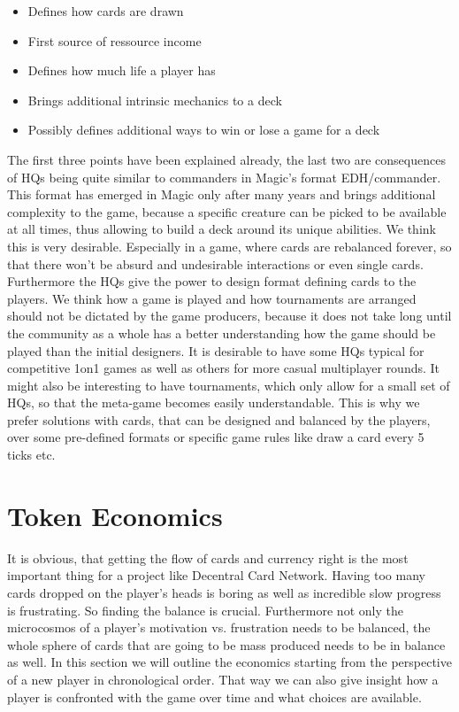 \documentclass{article}
\begin{document}
%
\begin{itemize}
	\item Defines how cards are drawn
	\item First source of ressource income
	\item Defines how much life a player has
	\item Brings additional intrinsic mechanics to a deck
	\item Possibly defines additional ways to win or lose a game for a deck
\end{itemize} 
%
The first three points have been explained already, the last two are consequences of HQs being quite similar to commanders in Magic's format EDH/commander. This format has emerged in Magic only after many years and brings additional complexity to the game, because a specific creature can be picked to be available at all times, thus allowing to build a deck around its unique abilities. We think this is very desirable. Especially in a game, where cards are rebalanced forever, so that there won't be absurd and undesirable interactions or even single cards. Furthermore the HQs give the power to design format defining cards to the players. We think how a game is played and how tournaments are arranged should not be dictated by the game producers, because it does not take long until the community as a whole has a better understanding how the game should be played than the initial designers. It is desirable to have some HQs typical for competitive 1on1 games as well as others for more casual multiplayer rounds. It might also be interesting to have tournaments, which only allow for a small set of HQs, so that the meta-game becomes easily understandable. This is why we prefer solutions with cards, that can be designed and balanced by the players, over some pre-defined formats or specific game rules like draw a card every 5 ticks etc.
%
\section{Token Economics}
%
It is obvious, that getting the flow of cards and currency right is the most important thing for a project like Decentral Card Network. Having too many cards dropped on the player's heads is boring as well as incredible slow progress is frustrating. So finding the balance is crucial. Furthermore not only the microcosmos of a player's motivation vs. frustration needs to be balanced, the whole sphere of cards that are going to be mass produced needs to be in balance as well. In this section we will outline the economics starting from the perspective of a new player in chronological order. That way we can also give insight how a player is confronted with the game over time and what choices are available.
%
\end{document}

